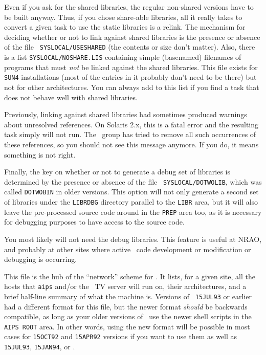 Even if you ask for the shared libraries, the regular non-shared versions
have to be built anyway.  Thus, if you chose share-able libraries, all it
really takes to convert a given task to use the static libraries is a
relink.  The mechanism for deciding whether or not to link against shared
libraries is the presence or absence of the file {\tt \dol
SYSLOCAL/USESHARED} (the contents or size don't matter).  Also, there is a
list {\tt\dol SYSLOCAL/NOSHARE.LIS} containing simple (basenamed)
filenames of programs that must {\it not\/} be linked against the shared
libraries.  This file exists for {\tt SUN4} installations (most of the
entries in it probably don't need to be there) but not for other
architectures.  You can always add to this list if you find a task that
does not behave well with shared libraries.

Previously, linking against shared libraries had sometimes produced
warnings about unresolved references.  On Solaris 2.x, this is a fatal
error and the resulting task simply will not run.  The \AIPS\ group has
tried to remove all such occurrences of these references, so you should
not see this message anymore.  If you do, it means something is not
right.

Finally, the key on whether or not to generate a debug set of libraries
is determined by the presence or absence of the file {\tt
\dol SYSLOCAL/DOTWOLIB}, which was called {\tt DOTWOBIN} in older versions.
This option will not only generate a second set of libraries under the
{\tt LIBRDBG} directory parallel to the {\tt LIBR} area, but it will
also leave the pre-processed source code around in the {\tt\dol PREP} area
too, as it is necessary for debugging purposes to have access to the
source code.

You most likely will not need the debug libraries.  This feature is
useful at NRAO, and probably at other sites where active \AIPS\ code
development or modification or debugging is occurring.
\medskip


This file is the hub of the ``network'' scheme for \AIPS.  It lists, for
a given site, all the hosts that {\tt aips} and/or the \AIPS\ TV server
will run on, their architectures, and a brief half-line summary of what
the machine is.
Versions of \AIPS\ {\tt 15JUL93} or earlier had a different format for
this file, but the newer format {\it should\/} be backwards compatible, as
long as your older versions of \AIPS\ use the newer shell scripts in the
{\tt\dol AIPS ROOT} area.  In other words, using the new format
will be possible in most cases for {\tt 15OCT92} and {\tt 15APR92}
versions if you want to use them as well as {\tt 15JUL93}, {\tt 15JAN94},
or {\tt\thisver}.

